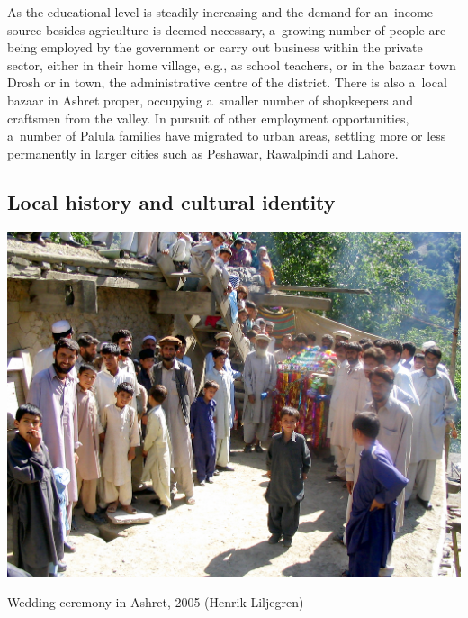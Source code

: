 As the educational level is steadily increasing and the demand for an~income source besides agriculture is deemed necessary, a~growing number of people are being employed by the government or carry out business within the private sector, either in their home village, e.g., as school teachers, or in the bazaar town Drosh or in \iliChitral town, the administrative centre of the district. There is also a~local bazaar in Ashret proper, occupying a~smaller number of shopkeepers and craftsmen from the valley. In pursuit of other employment opportunities, a~number of Palula families have migrated to urban areas, settling more or less permanently in larger cities such as Peshawar, Rawalpindi and Lahore.
 
\subsection{Local history and cultural identity}\label{Local history and cultural identity}
\label{subsec:1-2-3}
\begin{photofigure}
 \includegraphics[width=\textwidth]{photos/Photo02--WeddingAshret.JPG}
\caption{Wedding ceremony in Ashret, 2005 (Henrik Liljegren)}
\label{fig:1:weddingphoto}
\end{photofigure}


